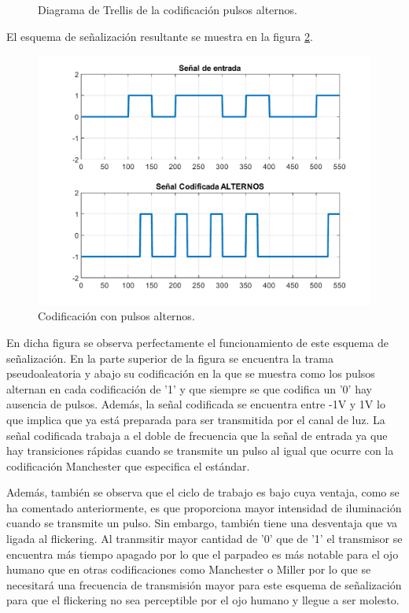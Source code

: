 \begin{figure}[ht]
    \centering
    
    \caption{\small{Diagrama de Trellis de la codificación pulsos alternos.}}
    \label{trellis_alternos}%
\end{figure}

El esquema de señalización resultante se muestra en la figura \ref{codificacion_alternos}.

\begin{figure}[ht]
    \centering
    \includegraphics[scale=0.5]{./figuras/CodificadaAlternos.pdf}
    \caption{\small{Codificación con pulsos alternos.}}
    \label{codificacion_alternos}%
\end{figure}

En dicha figura se observa perfectamente el funcionamiento de este esquema de 
señalización. En la parte superior de la figura se encuentra la trama pseudoaleatoria y 
abajo su codificación en la que se muestra como los pulsos alternan en cada codificación 
de '1' y que siempre se que codifica un '0' hay ausencia de pulsos. Además, la señal 
codificada se encuentra entre -1V y 1V lo que implica que ya está preparada para ser 
transmitida por el canal de luz. La señal codificada trabaja a el doble de frecuencia que 
la señal de entrada ya que hay transiciones rápidas cuando se transmite un pulso al igual
que ocurre con la codificación Manchester que especifica el estándar.

Además, también se observa que el ciclo de trabajo es bajo cuya ventaja, como se ha 
comentado anteriormente, es que proporciona mayor intensidad de iluminación cuando se 
transmite un pulso. Sin embargo, también tiene una desventaja que va ligada al flickering.
Al tranmsitir mayor cantidad de '0' que de '1' el transmisor se encuentra más tiempo 
apagado por lo que el parpadeo es más notable para el ojo humano que en otras 
codificaciones como Manchester o Miller por lo que se necesitará una frecuencia de 
transmisión mayor para este esquema de señalización para que el flickering no sea 
perceptible por el ojo humano y llegue a ser molesto.

